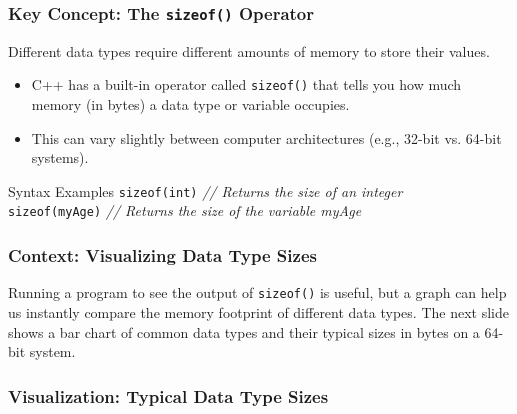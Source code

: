\documentclass{beamer}
\begin{document}
\begin{frame}
\frametitle{Key Concept: The \texttt{sizeof()} Operator}
Different data types require different amounts of memory to store their values.

\begin{itemize}
    \item C++ has a built-in operator called \texttt{sizeof()} that tells you how much memory (in \alert{bytes}) a data type or variable occupies.
    \item This can vary slightly between computer architectures (e.g., 32-bit vs. 64-bit systems).
\end{itemize}
\pause
\begin{block}{Syntax Examples}
\texttt{sizeof(int)} \hfill \textit{// Returns the size of an integer} \\
\texttt{sizeof(myAge)} \hfill \textit{// Returns the size of the variable myAge}
\end{block}
\end{frame}

\begin{frame}
\frametitle{Context: Visualizing Data Type Sizes}
Running a program to see the output of \texttt{sizeof()} is useful, but a graph can help us instantly compare the memory footprint of different data types. The next slide shows a bar chart of common data types and their typical sizes in bytes on a 64-bit system.
\end{frame}

\begin{frame}
\frametitle{Visualization: Typical Data Type Sizes}
\begin{figure}
\end{figure}
\end{frame}
\end{document}
